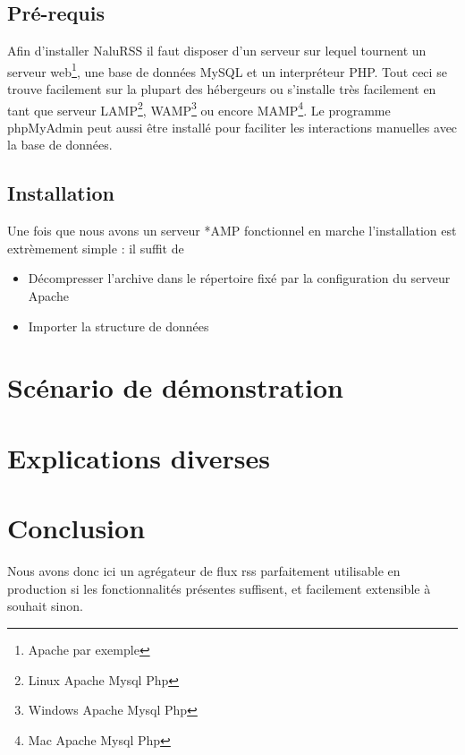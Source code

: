 \documentclass[11pt]{article}
\begin{document}
\subsection{Pré-requis}
Afin d'installer NaluRSS il faut disposer d'un serveur sur lequel tournent un serveur web\footnote{Apache par exemple}, une base de données MySQL et un interpréteur PHP. Tout ceci se trouve facilement sur la plupart des hébergeurs ou s'installe très facilement en tant que serveur LAMP\footnote{Linux Apache Mysql Php}, WAMP\footnote{Windows Apache Mysql Php} ou encore MAMP\footnote{Mac Apache Mysql Php}. Le programme phpMyAdmin peut aussi être installé pour faciliter les interactions manuelles avec la base de données.
\subsection{Installation}
Une fois que nous avons un serveur *AMP fonctionnel en marche l'installation est extrèmement simple : il suffit de 
\begin{itemize}
\item{Décompresser l'archive dans le répertoire fixé par la configuration du serveur Apache}
\item{Importer la structure de données}
\end{itemize}

\section{Scénario de démonstration}

\section{Explications diverses}

\section{Conclusion}
Nous avons donc ici un agrégateur de flux rss parfaitement utilisable en production si les fonctionnalités présentes suffisent, et facilement extensible à souhait sinon.
\end{document}
